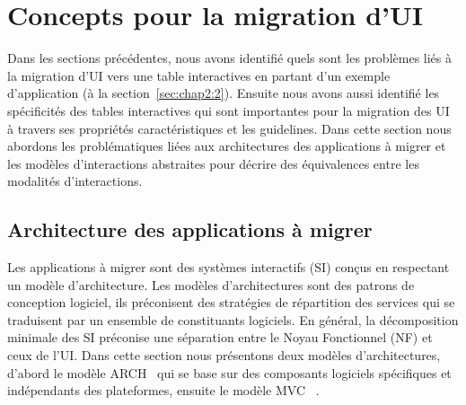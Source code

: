 \section{Concepts pour la migration d'UI}
\label{sec:chap2:5}
Dans les sections précédentes, nous avons identifié quels sont les problèmes liés à la migration d'UI vers une table interactives en partant d'un exemple d'application (à la section~\ref{sec:chap2:2}). Ensuite nous avons aussi identifié les spécificités des tables interactives qui sont importantes pour la migration des UI à travers ses propriétés caractéristiques et les guidelines. Dans cette section nous abordons les problématiques liées aux architectures des applications à migrer et les modèles d'interactions abstraites pour décrire des équivalences entre les modalités d'interactions.

\subsection{Architecture des applications à migrer}
\label{sec:chpa2:4:1}
Les applications à migrer sont des systèmes interactifs (SI) conçus en respectant un modèle d'architecture. Les modèles d'architectures sont des patrons de conception logiciel, ils  préconisent des stratégies de répartition des services qui se traduisent par un ensemble de constituants logiciels. En général, la décomposition minimale des SI préconise une séparation entre le Noyau Fonctionnel (NF) et ceux de l'UI. Dans cette section nous présentons deux modèles d'architectures, d'abord le modèle ARCH~\cite{UIMS1992} qui se base sur des composants logiciels spécifiques et indépendants des plateformes, ensuite le modèle MVC~\cite{Krasner1988} .


